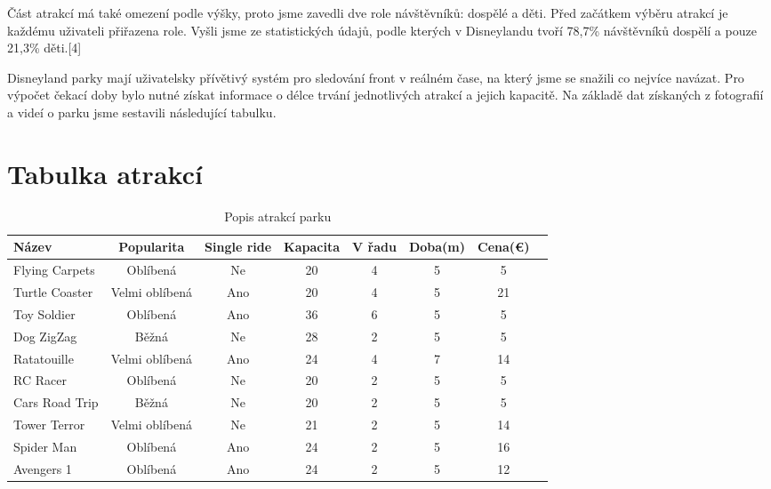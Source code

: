 \documentclass[a4paper,12pt]{article}
\begin{document}
Část atrakcí má také omezení podle výšky, proto jsme zavedli dve role návštěvníků: dospělé a děti. Před začátkem výběru atrakcí je každému uživateli přiřazena role. Vyšli jsme ze statistických údajů, podle kterých v Disneylandu tvoří 78,7\% návštěvníků dospělí a pouze 21,3\% děti.[4]

Disneyland parky mají uživatelsky přívětivý systém pro sledování front v reálném čase, na který jsme se snažili co nejvíce navázat. Pro výpočet čekací doby bylo nutné získat informace o délce trvání jednotlivých atrakcí a jejich kapacitě. Na základě dat získaných z fotografií a videí o parku jsme sestavili následující tabulku.
\section*{Tabulka atrakcí}

\begin{table}[h!]
	\centering
	\begin{tabular}{|l|c|c|c|c|c|c|c|}
		\hline
		\textbf{Název} &\textbf{Popularita}&\textbf{Single ride}&\textbf{Kapacita}&\textbf{V řadu}&\textbf{Doba(m)}&\textbf{Cena(€)}\\ \hline
		Flying Carpets        & Oblíbená         & Ne               & 20               & 4            & 5         & 5        \\ \hline
		Turtle Coaster        & Velmi oblíbená   & Ano              & 20               & 4            & 5         & 21       \\ \hline
		Toy Soldier           & Oblíbená         & Ano              & 36               & 6            & 5         & 5        \\ \hline
		Dog ZigZag            & Běžná            & Ne               & 28               & 2            & 5         & 5        \\ \hline
		Ratatouille           & Velmi oblíbená   & Ano              & 24               & 4            & 7         & 14       \\ \hline
		RC Racer              & Oblíbená         & Ne               & 20               & 2            & 5         & 5        \\ \hline
		Cars Road Trip        & Běžná            & Ne               & 20               & 2            & 5         & 5        \\ \hline
		Tower Terror          & Velmi oblíbená   & Ne               & 21               & 2            & 5         & 14       \\ \hline
		Spider Man            & Oblíbená         & Ano              & 24               & 2            & 5         & 16       \\ \hline
		Avengers 1            & Oblíbená         & Ano              & 24               & 2            & 5         & 12       \\ \hline
	\end{tabular}
	\caption{Popis atrakcí parku}
	\label{tab:attractions}
\end{table}
\end{document}
